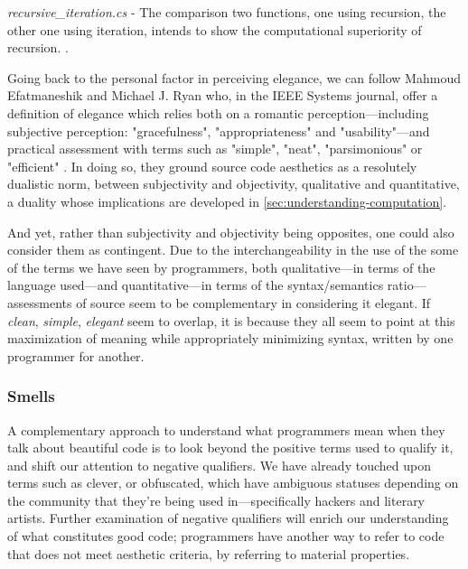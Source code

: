 \begin{listing}
  \inputminted{csharp}{./corpus/recursive_iteration.cs}
  \caption{\emph{recursive\_iteration.cs} - The comparison two functions, one using recursion, the other one using iteration, intends to show the computational superiority of recursion. \citep{amit_answer_2012}.}
  \label{code:recursion_iteration_csharp}
\end{listing}

Going back to the personal factor in perceiving elegance, we can follow Mahmoud Efatmaneshik and Michael J. Ryan who, in the IEEE Systems journal, offer a definition of elegance which relies both on a romantic perception—including subjective perception: "gracefulness", "appropriateness" and "usability"—and practical assessment with terms such as "simple", "neat", "parsimonious" or "efficient" \citep{efatmaneshnik_definitions_2019}. In doing so, they ground source code aesthetics as a resolutely dualistic norm, between subjectivity and objectivity, qualitative and quantitative, a duality whose implications are developed in \autoref{sec:understanding-computation}.

And yet, rather than subjectivity and objectivity being opposites, one could also consider them as contingent. \nohyphens{Due to the interchangeability in the use of the some of the terms we have seen by programmers, both qualitative—in terms of the language used—and quantitative—in terms of the syntax/semantics ratio—assessments of source seem to be complementary in considering it elegant}. If \emph{clean}, \emph{simple}, \emph{elegant} seem to overlap, it is because they all seem to point at this maximization of meaning while appropriately minimizing syntax, written by one programmer for another.

\subsubsection{Smells}
\label{subsubsec:smells}

A complementary approach to understand what programmers mean when they talk about beautiful code is to look beyond the positive terms used to qualify it, and shift our attention to negative qualifiers. We have already touched upon terms such as clever, or obfuscated, which have ambiguous statuses depending on the community that they're being used in—specifically hackers and literary artists. Further examination of negative qualifiers will enrich our understanding of what constitutes good code; programmers have another way to refer to code that does not meet aesthetic criteria, by referring to material properties.

